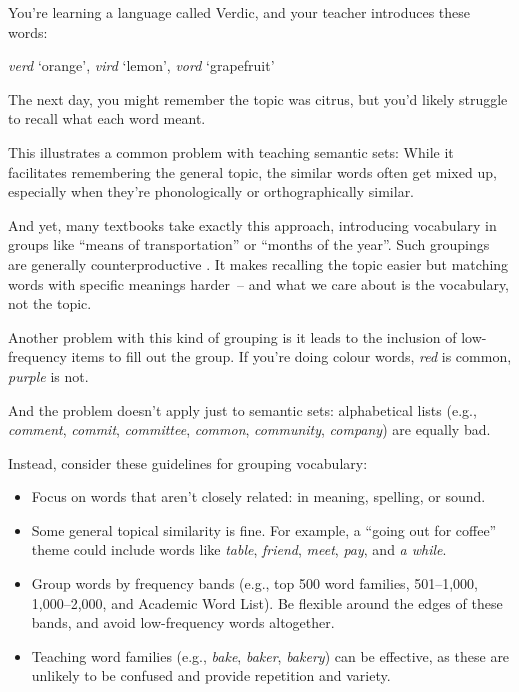 You're learning a language called Verdic, and your teacher introduces these words:

\ea \textit{verd} `orange', \textit{vird} `lemon', \textit{vord} `grapefruit'
\z

\noindent The next day, you might remember the topic was citrus, but you'd likely struggle to recall what each word meant.

This illustrates a common problem with teaching semantic sets: While it facilitates remembering the general topic, the similar words often get mixed up, especially when they're phonologically or orthographically similar.

And yet, many textbooks take exactly this approach, introducing vocabulary in groups like ``means of transportation'' or ``months of the year''. Such groupings are generally counterproductive \citep{finkbeiner2003semantic, higa1963interference, schurgin2020psychophysical, waring1997negative}. It makes recalling the topic easier but matching words with specific meanings harder~-- and what we care about is the vocabulary, not the topic.

Another problem with this kind of grouping is it leads to the inclusion of low-frequency items to fill out the group. If you're doing colour words, \textit{red} is common, \textit{purple} is not.

And the problem doesn't apply just to semantic sets: alphabetical lists (e.g., \textit{comment},\textit{ commit},\textit{ committee},\textit{ common},\textit{ community},\textit{ company}) are equally bad.

Instead, consider these guidelines for grouping vocabulary:

\begin{itemize}
    \item Focus on words that aren't closely related: in meaning, spelling, or sound.
    \item Some general topical similarity is fine. For example, a ``going out for coffee'' theme could include words like \textit{table}, \textit{friend}, \textit{meet}, \textit{pay}, and \textit{a while}.
    \item Group words by frequency bands (e.g., top 500 word families, 501--1,000, 1,000--2,000, and Academic Word List). Be flexible around the edges of these bands, and avoid low-frequency words altogether.
    \item Teaching word families (e.g., \textit{bake}, \textit{baker}, \textit{bakery}) can be effective, as these are unlikely to be confused and provide repetition and variety.
\end{itemize}

